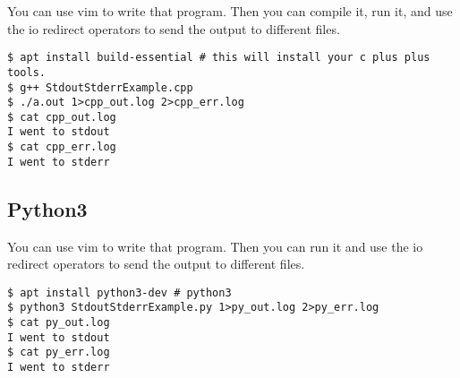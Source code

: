 \documentclass[12pt,a4paper]{article}
\begin{document}


You can use vim to write that program. Then you can compile it, run it, and use
the io redirect operators to send the output to different files.

\begin{lstlisting}[style=term]
$ apt install build-essential # this will install your c plus plus tools.
$ g++ StdoutStderrExample.cpp
$ ./a.out 1>cpp_out.log 2>cpp_err.log
$ cat cpp_out.log
I went to stdout
$ cat cpp_err.log
I went to stderr
\end{lstlisting}

\subsection*{Python3}



You can use vim to write that program. Then you can  run it and use
the io redirect operators to send the output to different files.

\begin{lstlisting}[style=term]
$ apt install python3-dev # python3
$ python3 StdoutStderrExample.py 1>py_out.log 2>py_err.log
$ cat py_out.log
I went to stdout
$ cat py_err.log
I went to stderr
\end{lstlisting}
\end{document}
